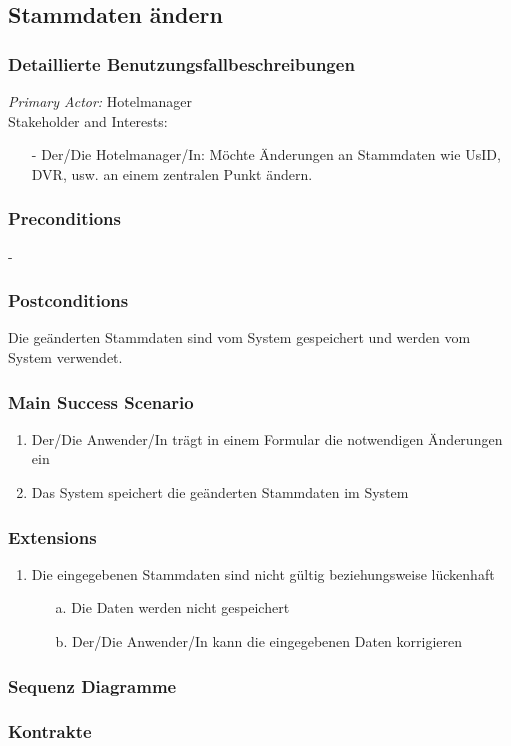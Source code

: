 \documentclass[./detailed_overview_usecases.tex]{subfiles}
\begin{document}
    \subsection{Stammdaten ändern}
    \subsubsection{Detaillierte Benutzungsfallbeschreibungen}
    \textit{Primary Actor:}
    Hotelmanager
    \\
    Stakeholder and Interests:
    \begin{itemize}
        \item[-] Der/Die Hotelmanager/In: Möchte Änderungen an Stammdaten wie UsID, DVR, usw. an  einem zentralen Punkt ändern.
    \end{itemize}

    \subsubsection*{Preconditions}
    -
    \subsubsection*{Postconditions}
    Die geänderten Stammdaten sind vom System gespeichert und werden vom System verwendet.

    \subsubsection*{Main Success Scenario}
    \begin{enumerate}
        \item Der/Die Anwender/In trägt in einem Formular die notwendigen Änderungen ein
        \item Das System speichert die geänderten Stammdaten im System
    \end{enumerate}

    \subsubsection*{Extensions}
    \begin{enumerate}
        \item Die eingegebenen Stammdaten sind nicht gültig beziehungsweise lückenhaft
        \begin{itemize}
            \item[a.] Die Daten werden nicht gespeichert
            \item[b.] Der/Die Anwender/In kann die eingegebenen Daten korrigieren
        \end{itemize}
    \end{enumerate}

    \subsubsection{Sequenz Diagramme}
    \subsubsection{Kontrakte}
\end{document}
